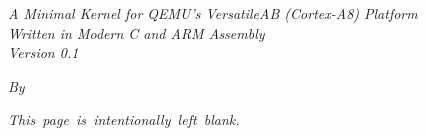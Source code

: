 \doublespacing
{}
\begin{titlepage}
    \begin{center}
        \vspace*{2in}
        \makeatletter
            {\Huge\bfseries \@title \par}
            \vspace{1em}
            \textit{A Minimal Kernel for QEMU's VersatileAB (Cortex-A8) Platform} \\
            \vspace{1em}
            \textit{Written in Modern C and ARM Assembly} \\
            \vspace{1em}
            \textit{Version 0.1} \\
            \vspace{1em}
            {\large \textit{By \@author} \par}
            \vspace{1em}
            {\small \@date {} \par}
            \vspace{20em}
            {\small {} \par}
            \vspace{1em}
        \makeatother
    \end{center}
\end{titlepage}

\setcounter{page}{2}

\newpage
\thispagestyle{empty}
\begin{center}
    \mbox{\textit{This page is intentionally left blank.}}
\end{center}